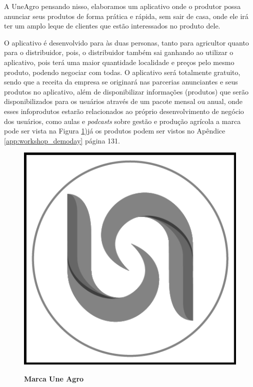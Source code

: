 A UneAgro pensando nisso, elaboramos um aplicativo onde o produtor possa anunciar seus produtos de forma prática e rápida, sem sair de casa, onde ele irá ter um amplo leque de clientes que estão interessados no produto dele.

O aplicativo é desenvolvido para às duas personas, tanto para agricultor quanto para o distribuidor, pois, o distribuidor também sai ganhando ao utilizar o aplicativo, pois terá uma maior quantidade localidade e preços pelo mesmo produto, podendo negociar com todas. O aplicativo será totalmente gratuito, sendo que a receita da empresa se originará nas parcerias anunciantes e seus produtos no aplicativo, além de disponibilizar informações (produtos) que serão disponibilizados para os usuários através de um pacote mensal ou anual, onde esses infoprodutos estarão relacionados ao próprio desenvolvimento de negócio dos usuários, como aulas e \textit{podcasts} sobre gestão e produção agrícola a marca pode ser vista na Figura \ref{figura_28})já os produtos podem ser vistos no Apêndice \ref{app:workshop_demoday} página 131.

\begin{figure}[H]
\centering
\caption{\textbf{Marca Une Agro}}
\includegraphics[scale=0.35]{Imagens/uneagro.png}
\label{figura_28}
\end{figure}


